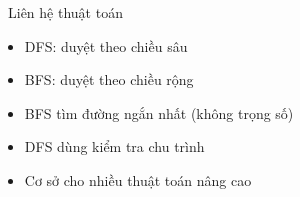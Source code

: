 \documentclass{beamer}
\begin{document}
\begin{frame}{\faCogs\ Liên hệ thuật toán}
\begin{tcolorbox}
\begin{itemize}
\item DFS: duyệt theo chiều sâu
\item BFS: duyệt theo chiều rộng
\item BFS tìm đường ngắn nhất (không trọng số)
\item DFS dùng kiểm tra chu trình
\item Cơ sở cho nhiều thuật toán nâng cao
\end{itemize}
\end{tcolorbox}
\end{frame}
\end{document}
